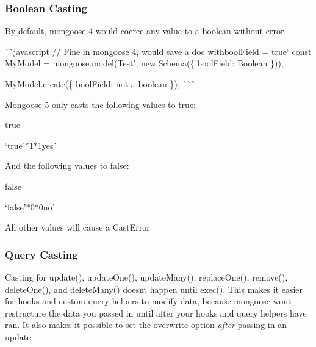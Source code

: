 \subsubsection*{Boolean Casting}

By default, mongoose 4 would coerce any value to a boolean without error.

\`{}\`{}{\ttfamily javascript // Fine in mongoose 4, would save a doc with}bool\+Field = true` const My\+Model = mongoose.\+model(\textquotesingle{}Test', new Schema(\{ bool\+Field\+: Boolean \}));

My\+Model.\+create(\{ bool\+Field\+: \textquotesingle{}not a boolean\textquotesingle{} \}); \`{}\`{}\`{}

Mongoose 5 only casts the following values to {\ttfamily true}\+:


\begin{DoxyItemize}
\item {\ttfamily true}
\item `\textquotesingle{}true'{\ttfamily  $\ast$}1{\ttfamily  $\ast$}\textquotesingle{}1\textquotesingle{}{\ttfamily  $\ast$}\textquotesingle{}yes\textquotesingle{}\`{}
\end{DoxyItemize}

And the following values to {\ttfamily false}\+:


\begin{DoxyItemize}
\item {\ttfamily false}
\item `\textquotesingle{}false'{\ttfamily  $\ast$}0{\ttfamily  $\ast$}\textquotesingle{}0\textquotesingle{}{\ttfamily  $\ast$}\textquotesingle{}no\textquotesingle{}\`{}
\end{DoxyItemize}

All other values will cause a {\ttfamily Cast\+Error} \subsubsection*{Query Casting}

Casting for {\ttfamily update()}, {\ttfamily update\+One()}, {\ttfamily update\+Many()}, {\ttfamily replace\+One()}, {\ttfamily remove()}, {\ttfamily delete\+One()}, and {\ttfamily delete\+Many()} doesn\textquotesingle{}t happen until {\ttfamily exec()}. This makes it easier for hooks and custom query helpers to modify data, because mongoose won\textquotesingle{}t restructure the data you passed in until after your hooks and query helpers have ran. It also makes it possible to set the {\ttfamily overwrite} option {\itshape after} passing in an update.

